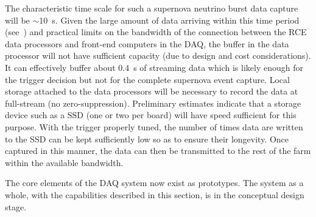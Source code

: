 The characteristic time scale for such a supernova neutrino burst data
capture will be $\sim$\SI{10}{\second}.  Given the large amount of
data arriving within this time period (see~\cite{cdr-annex-rates}) and practical
limits on the bandwidth of the connection between the RCE data
processors and front-end computers in the DAQ, 
the buffer in the data processor will not have
sufficient capacity (due to design and cost considerations). It can
effectively buffer about \SI{0.4}{\second} of streaming data which is
likely enough for the trigger decision but not for the complete
supernova event capture.  Local storage attached to the
data processors will be necessary to record the data at full-stream
(no zero-suppression).  Preliminary estimates indicate that a
storage device such as a SSD (one or two per board) will have speed
sufficient for this purpose.  With the trigger properly tuned, the number
of times data are written to the SSD can be kept sufficiently low so
as to ensure their longevity.  Once captured in this manner, the data
can then be transmitted to the rest of the farm within the available
bandwidth.

The core elements of the DAQ system now exist as prototypes.  The
system as a whole, with the capabilities described in this section, is in the
conceptual design stage. %





